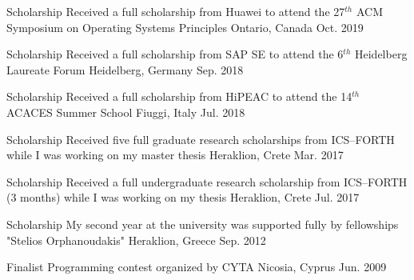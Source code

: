 \begin{cvhonors}
  \cvhonor
    {Scholarship} %
    {Received a full scholarship from Huawei to attend the 27$^{th}$
    ACM Symposium on Operating Systems Principles} %
    {Ontario, Canada} %
    {Oct. 2019} %

  \cvhonor
    {Scholarship} %
    {Received a full scholarship from SAP SE to attend the 6$^{th}$
    Heidelberg Laureate Forum} %
    {Heidelberg, Germany} %
    {Sep. 2018} %

  \cvhonor
    {Scholarship} %
    {Received a full scholarship from HiPEAC to attend the 14$^{th}$
    ACACES Summer School} %
    {Fiuggi, Italy} %
    {Jul. 2018} %

  \cvhonor
    {Scholarship} %
    {Received five full graduate research scholarships from ICS--FORTH
     while I was working on my master thesis} %
    {Heraklion, Crete} %
    {Mar. 2017} %

  \cvhonor
    {Scholarship} %
    {Received a full undergraduate research scholarship from
    ICS--FORTH (3 months) while I was working on my thesis} %
    {Heraklion, Crete} %
    {Jul. 2017} %
  
  \cvhonor
    {Scholarship} %
    {My second year at the university was supported fully by
          fellowships "Stelios Orphanoudakis"} %
    {Heraklion, Greece} %
    {Sep. 2012} %

  \cvhonor
    {Finalist} %
    {Programming contest organized by CYTA} %
    {Nicosia, Cyprus} %
    {Jun. 2009} %

\end{cvhonors}
